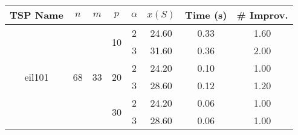 \begin{tabular}{|ccccc|ccc|}
\toprule
       TSP Name & $n$ & $m$ & $p$ & $\alpha$   & $x(S)$ &  Time (s) &  \# Improv. \\
\midrule
\multirow{6}{*}{eil101} & \multirow{6}{*}{68} & \multirow{6}{*}{33} & \multirow{2}{*}{10} & 2 & 24.60 &  0.33 &     1.60 \\
       &    &    &    & 3 & 31.60 &  0.36 &     2.00 \\
\cline{4-8}
       &    &    & \multirow{2}{*}{20} & 2 & 24.20 &  0.10 &     1.00 \\
       &    &    &    & 3 & 28.60 &  0.12 &     1.20 \\
\cline{4-8}
       &    &    & \multirow{2}{*}{30} & 2 & 24.20 &  0.06 &     1.00 \\
       &    &    &    & 3 & 28.60 &  0.06 &     1.00 \\
\bottomrule
\end{tabular}
